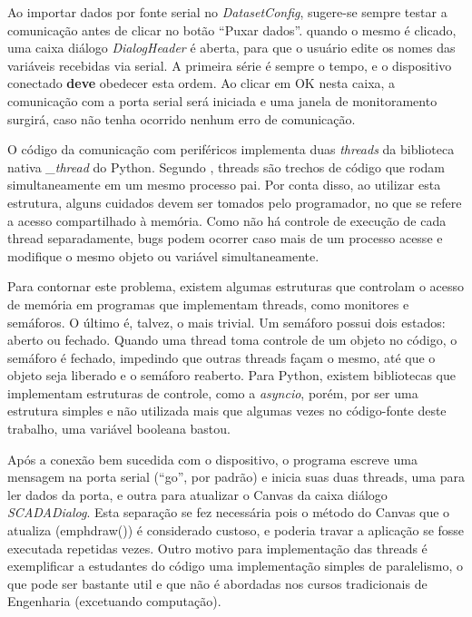 Ao importar dados por fonte serial no \emph{DatasetConfig}, sugere-se sempre testar a comunicação antes de clicar no botão “Puxar dados”. quando o mesmo é clicado, uma caixa diálogo \emph{DialogHeader} é aberta, para que o usuário edite os nomes das variáveis recebidas via serial. A primeira série é sempre o tempo, e o dispositivo conectado \textbf{deve} obedecer esta ordem. Ao clicar em OK nesta caixa, a comunicação com a porta serial será iniciada e uma janela de monitoramento surgirá, caso não tenha ocorrido nenhum erro de comunicação.

O código da comunicação com periféricos implementa duas \emph{threads} da biblioteca nativa \emph{\_thread} do Python. Segundo , threads são trechos de código que rodam simultaneamente em um mesmo processo pai. Por conta disso, ao utilizar esta estrutura, alguns cuidados devem ser tomados pelo programador, no que se refere a acesso compartilhado à memória. Como não há controle de execução de cada thread separadamente, bugs podem ocorrer caso mais de um processo acesse e modifique o mesmo objeto ou variável simultaneamente.

Para contornar este problema, existem algumas estruturas que controlam o acesso de memória em programas que implementam threads, como monitores e semáforos. O último é, talvez, o mais trivial. Um semáforo possui dois estados: aberto ou fechado. Quando uma thread toma controle de um objeto no código, o semáforo é fechado, impedindo que outras threads façam o mesmo, até que o objeto seja liberado e o semáforo reaberto. Para Python, existem bibliotecas que implementam estruturas de controle, como a \emph{asyncio}, porém, por ser uma estrutura simples e não utilizada mais que algumas vezes no código-fonte deste trabalho, uma variável booleana bastou.

Após a conexão bem sucedida com o dispositivo, o programa escreve uma mensagem na porta serial (“go”, por padrão) e inicia suas duas threads, uma para ler dados da porta, e outra para atualizar o Canvas da caixa diálogo \emph{SCADADialog}. Esta separação se fez necessária pois o método do Canvas que o atualiza (emph{draw()}) é considerado custoso, e poderia travar a aplicação se fosse executada repetidas vezes. Outro motivo para implementação das threads é exemplificar a estudantes do código uma implementação simples de paralelismo, o que pode ser bastante util e que não é abordadas nos cursos tradicionais de Engenharia (excetuando computação).

